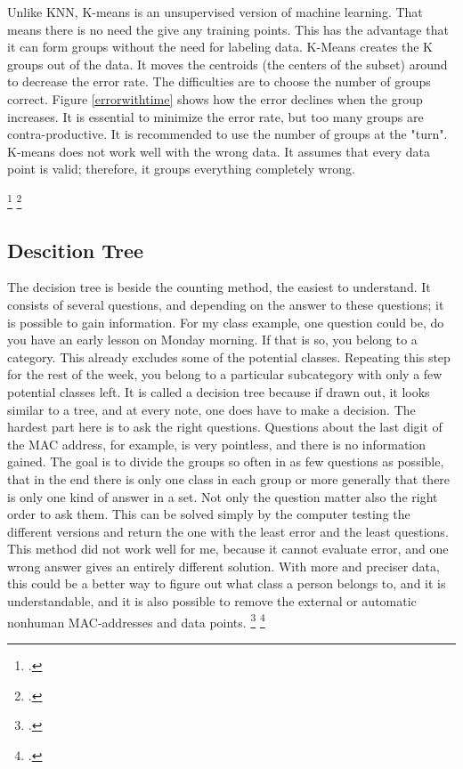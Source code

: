 \documentclass[11pt]{article}
\begin{document}
Unlike KNN, K-means is an unsupervised version of machine learning. That means there is no need the give any training points. This has the advantage that it can form groups without the need for labeling data. K-Means creates the K groups out of the data. It moves the centroids (the centers of the subset) around to decrease the error rate. The difficulties are to choose the number of groups correct. Figure \ref{errorwithtime} shows how the error declines when the group increases. It is essential to minimize the error rate, but too many groups are contra-productive. It is recommended to use the number of groups at the "turn".
K-means does not work well with the wrong data. It assumes that every data point is valid; therefore, it groups everything completely wrong.

\footcite{datasciencefromscratch}
\footcite{dataalgorithms}
\subsection{Descition Tree}
The decision tree is beside the counting method, the easiest to understand. It consists of several questions, and depending on the answer to these questions; it is possible to gain information. For my class example, one question could be, do you have an early lesson on Monday morning. If that is so, you belong to a category. This already excludes some of the potential classes. Repeating this step for the rest of the week, you belong to a particular subcategory with only a few potential classes left. It is called a decision tree because if drawn out, it looks similar to a tree, and at every note, one does have to make a decision. The hardest part here is to ask the right questions. Questions about the last digit of the MAC address, for example, is very pointless, and there is no information gained. The goal is to divide the groups so often in as few questions as possible, that in the end there is only one class in each group or more generally that there is only one kind of answer in a set. Not only the question matter also the right order to ask them. This can be solved simply by the computer testing the different versions and return the one with the least error and the least questions. This method did not work well for me, because it cannot evaluate error, and one wrong answer gives an entirely different solution. With more and preciser data, this could be a better way to figure out what class a person belongs to, and it is understandable, and it is also possible to remove the external or automatic nonhuman MAC-addresses and data points.
\footcite{datasciencefromscratch}
\footcite{dataalgorithms}
\end{document}
